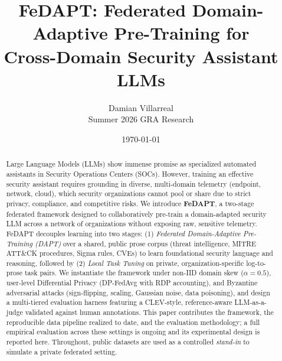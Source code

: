 \documentclass[11pt,a4paper]{article}
\title{FeDAPT: Federated Domain-Adaptive Pre-Training for\\Cross-Domain Security Assistant LLMs}
\author{Damian Villarreal \\
  Summer 2026 GRA Research \\}
\date{\today}
\begin{document}
\maketitle

\begin{abstract}
Large Language Models (LLMs) show immense promise as specialized automated assistants in Security Operations Centers (SOCs). However, training an effective security assistant requires grounding in diverse, multi-domain telemetry (endpoint, network, cloud), which security organizations cannot pool or share due to strict privacy, compliance, and competitive risks. We introduce \textbf{FeDAPT}, a two-stage federated framework designed to collaboratively pre-train a domain-adapted security LLM across a network of organizations without exposing raw, sensitive telemetry. FeDAPT decouples learning into two stages: (1) \emph{Federated Domain-Adaptive Pre-Training (DAPT)} over a shared, public prose corpus (threat intelligence, MITRE ATT\&CK procedures, Sigma rules, CVEs) to learn foundational security language and reasoning, followed by (2) \emph{Local Task Tuning} on private, organization-specific log-to-prose task pairs. We instantiate the framework under non-IID domain skew ($\alpha{=}0.5$), user-level Differential Privacy (DP-FedAvg with RDP accounting), and Byzantine adversarial attacks (sign-flipping, scaling, Gaussian noise, data poisoning), and design a multi-tiered evaluation harness featuring a CLEV-style, reference-aware LLM-as-a-judge validated against human annotations. This paper contributes the framework, the reproducible data pipeline realized to date, and the evaluation methodology; a full empirical evaluation across these settings is ongoing and its experimental design is reported here. Throughout, public datasets are used as a controlled \emph{stand-in} to simulate a private federated setting.
\end{abstract}
\end{document}
